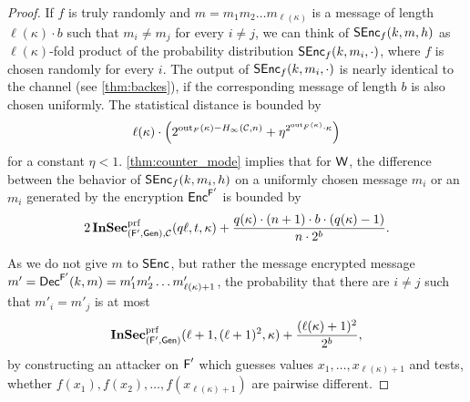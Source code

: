 \begin{proof}
  If $f$ is truly randomly and $m=m_{1}m_{2}\ldots m_{\ell(\kappa)}$ is
  a message of length $\ell(\kappa)\cdot b$ such that $m_{i}\neq m_{j}$
  for every $i\neq j$, we can think of $\operatorname{\mathsf{SEnc}}_{f}(k,m,h)$ as
  $\ell(\kappa)$-fold product of the probability distribution
  $\operatorname{\mathsf{SEnc}}_{f}(k,m_{i},\cdot)$, where $f$ is chosen randomly for every $i$.
  The output of $\operatorname{\mathsf{SEnc}}_{f}(k,m_{i},\cdot)$ is nearly identical to the
  channel (see \autoref{thm:backes}), if the corresponding message of
  length $b$ is also chosen uniformly. The statistical distance is
  bounded by 
  \begin{align*}
    \ell(\kappa)\cdot \left(2^{\operatorname{out}_{F}(\kappa)-H_{\infty}(\mathcal{C},n)}+\eta^{2^{\operatorname{out}_{F}(\kappa)}\cdot
  \kappa}\right)
  \end{align*}
for a constant $\eta < 1$.
 \autoref{thm:counter_mode}
  implies that for $\operatorname{\mathsf{W}}$, the difference between the behavior of
  $\operatorname{\mathsf{SEnc}}_{f}(k,m_{i},h)$ on a uniformly chosen message $m_{i}$ or an
  $m_{i}$ generated by the encryption $\operatorname{\mathsf{Enc}}^{\operatorname{\mathsf{F}}'}$ is bounded by
  \begin{align*}
    2\operatorname{\mathbf{InSec}}^{\operatorname{prf}}_{(\operatorname{\mathsf{F}}',\operatorname{\mathsf{Gen}}),\mathcal{C}}(q\ell,t,\kappa)+ \frac{q(\kappa)\cdot (n+1)\cdot b\cdot 
        (q(\kappa)-1)}{n\cdot 2^{b}}.
  \end{align*}

  
  As we do not give $m$ to $\operatorname{\mathsf{SEnc}}$, but rather the message encrypted message
  $m'=\operatorname{\mathsf{Dec}}^{\operatorname{\mathsf{F}}'}(k,m)=m'_{1}m'_{2}\ldots m'_{\ell(\kappa)+1}$, the probability that
  there are $i\neq j$ such that $m'_{i}=m'_{j}$ is at most
  \begin{align*}
    \operatorname{\mathbf{InSec}}^{\operatorname{prf}}_{(\operatorname{\mathsf{F}}',\operatorname{\mathsf{Gen}})}(\ell+1,(\ell+1)^{2},\kappa)+\frac{(\ell(\kappa)+1)^{2}}{2^{b}},    
  \end{align*}
  by constructing an attacker on $\operatorname{\mathsf{F}}'$ which guesses values
  $x_{1},\ldots,x_{\ell(\kappa)+1}$ and tests, whether 
  $f(x_{1}),f(x_{2}),\ldots,f(x_{\ell(\kappa)+1})$ are pairwise different. 


\end{proof}
